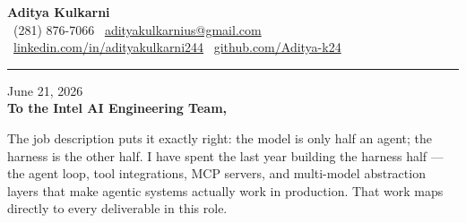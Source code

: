 \documentclass[11pt,letterpaper]{article}
\begin{document}
\begin{center}
    {\Huge \textbf{\color{IntelBlue} Aditya Kulkarni}}\\[8pt]
    {\color{DarkGrey} \small
    \faPhone \ (281) 876-7066 \quad \textbar \quad
    \faEnvelope \ \href{mailto:adityakulkarnius@gmail.com}{adityakulkarnius@gmail.com} \\[4pt]
    \faLinkedin \ \href{https://linkedin.com/in/adityakulkarni244}{linkedin.com/in/adityakulkarni244} \quad \textbar \quad
    \faGithub \ \href{https://github.com/Aditya-k24}{github.com/Aditya-k24}
    }
\end{center}

\vspace{-4pt}
{\color{IntelBlue}\rule{\linewidth}{1.5pt}}
\vspace{10pt}

June 21, 2026\\[10pt]
\textbf{To the Intel AI Engineering Team,}

\vspace{6pt}

The job description puts it exactly right: the model is only half an agent; the harness is the other half. I have spent the last year building the harness half --- the agent loop, tool integrations, MCP servers, and multi-model abstraction layers that make agentic systems actually work in production. That work maps directly to every deliverable in this role.

\vspace{4pt}
\end{document}

